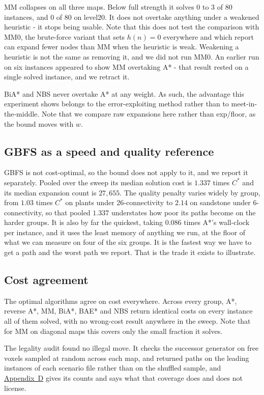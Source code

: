 \documentclass[letterpaper]{article} %
\begin{document}
MM collapses on all three maps. Below full strength it solves $0$ to $3$ of $80$ instances, and $0$ of $80$ on level20. It does not overtake anything under a weakened heuristic - it stops being usable. Note that this does not test the comparison with MM0, the brute-force variant that sets $h(n)=0$ everywhere and which \citet{holte2017mm} report can expand fewer nodes than MM when the heuristic is weak. Weakening a heuristic is not the same as removing it, and we did not run MM0. An earlier run on six instances appeared to show MM overtaking A* - that result rested on a single solved instance, and we retract it.

BiA* and NBS never overtake A* at any weight. As such, the advantage this experiment shows belongs to the error-exploiting method rather than to meet-in-the-middle. Note that we compare raw expansions here rather than exp/floor, as the bound moves with $w$.

\subsection{GBFS as a speed and quality reference}
GBFS is not cost-optimal, so the bound does not apply to it, and we report it separately. Pooled over the sweep its median solution cost is $1.337$ times $C^*$ and its median expansion count is $27{,}655$. The quality penalty varies widely by group, from $1.03$ times $C^*$ on plants under 26-connectivity to $2.14$ on sandstone under 6-connectivity, so that pooled $1.337$ understates how poor its paths become on the harder groups. It is also by far the quickest, taking $0.086$ times A*'s wall-clock per instance, and it uses the least memory of anything we run, at the floor of what we can measure on four of the six groups. It is the fastest way we have to get a path and the worst path we report. That is the trade it exists to illustrate.

\subsection{Cost agreement}
The optimal algorithms agree on cost everywhere. Across every group, A*, reverse A*, MM, BiA*, BAE* and NBS return identical costs on every instance all of them solved, with no wrong-cost result anywhere in the sweep. Note that for MM on diagonal maps this covers only the small fraction it solves.

The legality audit found no illegal move. It checks the successor generator on free voxels sampled at random across each map, and returned paths on the leading instances of each scenario file rather than on the shuffled sample, and \hyperref[app:d]{Appendix~D} gives its counts and says what that coverage does and does not license.
\end{document}
